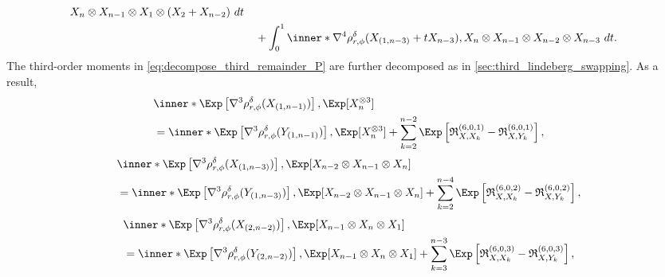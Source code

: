 \documentclass[aos]{imsart}
\begin{document}
\begin{appendix}
\begin{equation*}
\begin{aligned}
{        X_n \otimes X_{n-1} \otimes X_1 \otimes (X_2 + X_{n-2}) } ~dt \\
    & \quad + \int_0^1 \inner*{
        \nabla^4 \rho_{r,\phi}^\delta(X_{(1,n-3)} + t X_{n-3}), 
        X_n \otimes X_{n-1} \otimes X_{n-2} \otimes X_{n-3}} ~dt. \\
\end{aligned}
\end{equation*}
The third-order moments in \cref{eq:decompose_third_remainder_P} are further decomposed as in \cref{sec:third_lindeberg_swapping}. As a result,
\begin{equation*}
\begin{aligned}
    & \inner*{ \Exp\left[ \nabla^3 \rho_{r,\phi}^\delta(X_{(1,n-1)}) \right], \Exp[ X_n^{\otimes 3} ]} \\
    & = \inner*{ \Exp\left[ \nabla^3 \rho_{r,\phi}^\delta(Y_{(1,n-1)}) \right], \Exp[ X_n^{\otimes 3} ]}
    + \sum_{k=2}^{n-2} \Exp \left[ 
        \mathfrak{R}_{X,X_k}^{(6,0,1)}
        - \mathfrak{R}_{X,Y_k}^{(6,0,1)}
    \right], \\
\end{aligned}
\end{equation*}
\begin{equation*}
\begin{aligned}
    & \inner*{ \Exp\left[ \nabla^3 \rho_{r,\phi}^\delta(X_{(1,n-3)}) \right], \Exp[ X_{n-2} \otimes X_{n-1} \otimes X_n ]} \\
    & = \inner*{ \Exp\left[ \nabla^3 \rho_{r,\phi}^\delta(Y_{(1,n-3)}) \right], \Exp[ X_{n-2} \otimes X_{n-1} \otimes X_n ]}
    + \sum_{k=2}^{n-4} \Exp \left[ 
        \mathfrak{R}_{X,X_k}^{(6,0,2)}
        - \mathfrak{R}_{X,Y_k}^{(6,0,2)}
    \right], \\
\end{aligned}
\end{equation*}
\begin{equation*}
\begin{aligned}
    & \inner*{ \Exp\left[ \nabla^3 \rho_{r,\phi}^\delta(X_{(2,n-2)}) \right], \Exp[ X_{n-1} \otimes X_{n} \otimes X_1 ]} \\
    & = \inner*{ \Exp\left[ \nabla^3 \rho_{r,\phi}^\delta(Y_{(2,n-2)}) \right], \Exp[ X_{n-1} \otimes X_{n} \otimes X_1 ]}
    + \sum_{k=3}^{n-3} \Exp \left[ 
        \mathfrak{R}_{X,X_k}^{(6,0,3)}
        - \mathfrak{R}_{X,Y_k}^{(6,0,3)}
    \right], \\
\end{aligned}
\end{equation*}
\begin{equation*}

\end{equation*}
\end{appendix}
\end{document}

